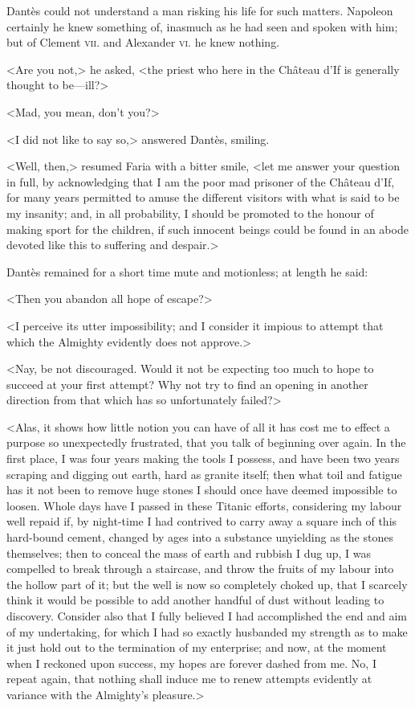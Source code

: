  Dantès could not understand a man risking his life for such matters. Napoleon certainly he knew something of, inasmuch as he had seen and spoken with him; but of Clement \textsc{vii.} and Alexander \textsc{vi.} he knew nothing. 

 <Are you not,> he asked, <the priest who here in the Château d'If is generally thought to be—ill?> 

 <Mad, you mean, don't you?> 

 <I did not like to say so,> answered Dantès, smiling. 

 <Well, then,> resumed Faria with a bitter smile, <let me answer your question in full, by acknowledging that I am the poor mad prisoner of the Château d'If, for many years permitted to amuse the different visitors with what is said to be my insanity; and, in all probability, I should be promoted to the honour of making sport for the children, if such innocent beings could be found in an abode devoted like this to suffering and despair.> 

 Dantès remained for a short time mute and motionless; at length he said: 

 <Then you abandon all hope of escape?> 

 <I perceive its utter impossibility; and I consider it impious to attempt that which the Almighty evidently does not approve.> 

 <Nay, be not discouraged. Would it not be expecting too much to hope to succeed at your first attempt? Why not try to find an opening in another direction from that which has so unfortunately failed?> 

 <Alas, it shows how little notion you can have of all it has cost me to effect a purpose so unexpectedly frustrated, that you talk of beginning over again. In the first place, I was four years making the tools I possess, and have been two years scraping and digging out earth, hard as granite itself; then what toil and fatigue has it not been to remove huge stones I should once have deemed impossible to loosen. Whole days have I passed in these Titanic efforts, considering my labour well repaid if, by night-time I had contrived to carry away a square inch of this hard-bound cement, changed by ages into a substance unyielding as the stones themselves; then to conceal the mass of earth and rubbish I dug up, I was compelled to break through a staircase, and throw the fruits of my labour into the hollow part of it; but the well is now so completely choked up, that I scarcely think it would be possible to add another handful of dust without leading to discovery. Consider also that I fully believed I had accomplished the end and aim of my undertaking, for which I had so exactly husbanded my strength as to make it just hold out to the termination of my enterprise; and now, at the moment when I reckoned upon success, my hopes are forever dashed from me. No, I repeat again, that nothing shall induce me to renew attempts evidently at variance with the Almighty's pleasure.> 

